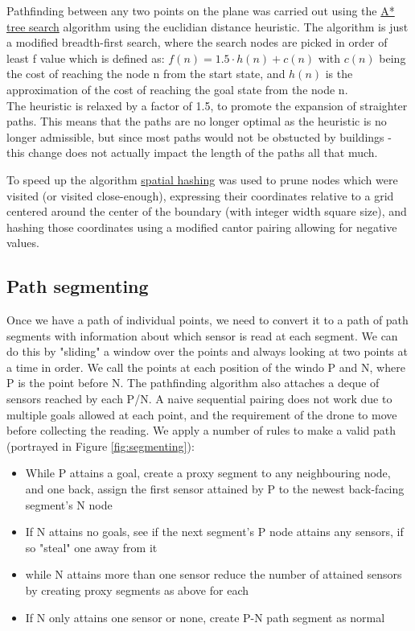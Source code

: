 \documentclass[10pt,a4paper]{article}
\begin{document}
Pathfinding between any two points on the plane was carried out using the \hyperref[tab:AstarTreeSearch]{\color{blue}A* tree search} algorithm using the euclidian distance heuristic. 
The algorithm is just a modified breadth-first search, where the search nodes are picked in order of least f value which is defined as:
    $f(n) = 1.5 \cdot h(n) + c(n)$
with $c(n)$ being the cost of reaching the node n from the start state, and $h(n)$ is the approximation of the cost of reaching the goal state from the node n.
\\

\noindent The heuristic is relaxed by a factor of 1.5, to promote the expansion of straighter paths.
\noindent This means that the paths are no longer optimal as the heuristic is no longer admissible, but since most paths would not be obstucted by buildings - this
change does not actually impact the length of the paths all that much.

To speed up the algorithm \hyperref[tab:GridSnappingSpatialHash]{\color{blue}spatial hashing} was used to prune nodes which were visited (or visited close-enough), expressing their coordinates relative to a grid centered around the center of the boundary (with integer width square size), and hashing those coordinates
using a modified cantor pairing allowing for negative values.

\subsection{Path segmenting}
Once we have a path of individual points, we need to convert it to a path of path segments with information about which sensor is read at each segment.
We can do this by "sliding" a window over the points and always looking at two points at a time in order. 
We call the points at each position of the windo P and N, where P is the point before N. 
The pathfinding algorithm also attaches a deque of sensors reached by each P/N.  
A naive sequential pairing does not work due to multiple goals allowed at each point, and the requirement of the drone to move before collecting the reading.
We apply a number of rules to make a valid path
\noindent (portrayed in Figure \ref{fig:segmenting}):
\begin{itemize}
    \item While P attains a goal, create a proxy segment to any neighbouring node, and one back, assign the first sensor attained by P 
        to the newest back-facing segment's N node
    \item If N attains no goals, see if the next segment's P node attains any sensors, if so "steal" one away from it
    \item while N attains more than one sensor reduce the number of attained sensors by creating proxy segments as above for each
    \item If N only attains one sensor or none, create P-N path segment as normal
\end{itemize}
\end{document}
